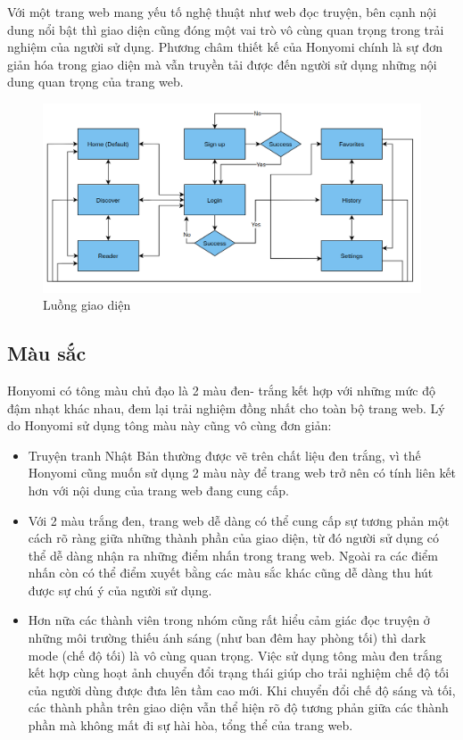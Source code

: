\documentclass[./../main.tex]{subfiles}
\begin{document}
Với một trang web mang yếu tố nghệ thuật như web đọc truyện, bên cạnh nội dung nổi bật thì giao diện cũng đóng một vai trò vô cùng quan trọng trong trải nghiệm của người sử dụng. Phương châm thiết kế của Honyomi chính là sự đơn giản hóa trong giao diện mà vẫn truyền tải được đến người sử dụng những nội dung quan trọng của trang web.

\begin{figure}[H]
	\centering
	\includegraphics[width=\linewidth]{./images/image1.png}
	\caption{Luồng giao diện}
\end{figure}

\subsection{Màu sắc}

Honyomi có tông màu chủ đạo là 2 màu đen- trắng kết hợp với những mức độ đậm nhạt khác nhau, đem lại trải nghiệm đồng nhất cho toàn bộ trang web. Lý do Honyomi sử dụng tông màu này cũng vô cùng đơn giản:

\begin{itemize}
	\item Truyện tranh Nhật Bản thường được vẽ trên chất liệu đen trắng, vì thế Honyomi cũng muốn sử dụng 2 màu này để trang web trở nên có tính liên kết hơn với nội dung của trang web đang cung cấp.
	\item Với 2 màu trắng đen, trang web dễ dàng có thể cung cấp sự tương phản một cách rõ ràng giữa những thành phần của giao diện, từ đó người sử dụng có thể dễ dàng nhận ra những điểm nhấn trong trang web. Ngoài ra các điểm nhấn còn có thể điểm xuyết bằng các màu sắc khác cũng dễ dàng thu hút được sự chú ý của người sử dụng.
	\item Hơn nữa các thành viên trong nhóm cũng rất hiểu cảm giác đọc truyện ở những môi trường thiếu ánh sáng (như ban đêm hay phòng tối) thì dark mode (chế độ tối) là vô cùng quan trọng. Việc sử dụng tông màu đen trắng kết hợp cùng hoạt ảnh chuyển đổi trạng thái giúp cho trải nghiệm chế độ tối của người dùng được đưa lên tầm cao mới. Khi chuyển đổi chế độ sáng và tối, các thành phần trên giao diện vẫn thể hiện rõ độ tương phản giữa các thành phần mà không mất đi sự hài hòa, tổng thể của trang web.
\end{itemize}
\end{document}
